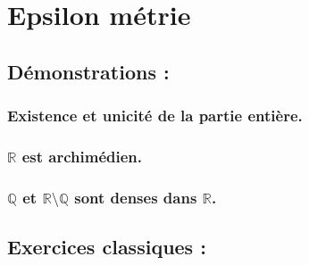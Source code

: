 \section{Epsilon métrie}
\subsection{Démonstrations :}
\subsubsection{Existence et unicité de la partie entière.}
\subsubsection{$\mathbb{R}$ est archimédien.}
\subsubsection{$\mathbb{Q}$ et $\mathbb{R}\setminus \mathbb{Q}$ sont denses dans $\mathbb{R}$.}



\subsection{Exercices classiques :}
